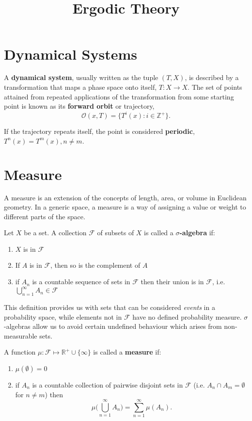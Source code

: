 \documentclass{article}
\title{\vspace{-3cm} Ergodic Theory}
\author{}
\date{}
\begin{document}
\maketitle
\vspace{-1.5cm}
\section{Dynamical Systems}
A \textbf{dynamical system}, usually written as the tuple $(T, X)$, is described by a transformation that maps a phase space onto itself, $T: X \to X$. The set of points attained from repeated applications of the transformation from some starting point is known as its \textbf{forward orbit} or trajectory, 
\[
\mathcal{O}(x, T) = \{ T^i(x) : i \in \mathbb Z^+ \}. 
\]

If the trajectory repeats itself, the point is considered \textbf{periodic}, $T^n(x) = T^m(x), n \neq m $.

\section{Measure}
A measure is an extension of the concepts of length, area, or volume in Euclidean geometry. In a generic space, a measure is a way of assigning a value or weight to different parts of the space.

Let $X$ be a set. A collection $\mathcal{F}$ of subsets of $X$ is called a \textbf{$\sigma$-algebra} if:
\begin{enumerate}
    \item $X$ is in $\mathcal{F}$
    \item If $A$ is in $\mathcal{F}$, then so is the complement of $A$
    \item  if $A_n$ is a countable sequence of sets in $\mathcal{F}$ then their union is in $\mathcal{F}$, i.e. $ \displaystyle \bigcup_{n=1}^{\infty} A_n \in \mathcal{F}$
\end{enumerate}
This definition provides us with sets that can be considered \emph{events} in a probability space, while elements not in $\mathcal{F}$ have no defined probability measure. $\sigma$-algebras allow us to avoid certain undefined behaviour which arises from non-measurable sets.

A function $\mu: \mathcal{F} \mapsto \mathbb{R}^+ \cup \{\infty\}$ is called a \textbf{measure} if:
\begin{enumerate}
    \item $\mu(\emptyset)=0$
    \item if $A_n$ is a countable collection of pairwise disjoint sets in $\mathcal{F}$ (i.e. $A_n \cap A_m = \emptyset$ for $n \neq m$) then
    \[
        \mu \Big(  \bigcup_{n=1}^{\infty} A_n \Big) = \sum_{n=1}^{\infty}\mu(A_n).
    \]
\end{enumerate}
\end{document}
